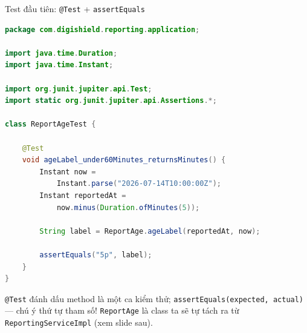 \documentclass[aspectratio=169,12pt]{beamer}
\begin{document}
\begin{frame}[fragile,shrink=8]{Test đầu tiên: \texttt{@Test} + \texttt{assertEquals}}
\begin{lstlisting}[language=java]
package com.digishield.reporting.application;

import java.time.Duration;
import java.time.Instant;

import org.junit.jupiter.api.Test;
import static org.junit.jupiter.api.Assertions.*;

class ReportAgeTest {

    @Test
    void ageLabel_under60Minutes_returnsMinutes() {
        Instant now =
            Instant.parse("2026-07-14T10:00:00Z");
        Instant reportedAt =
            now.minus(Duration.ofMinutes(5));

        String label = ReportAge.ageLabel(reportedAt, now);

        assertEquals("5p", label);
    }
}
\end{lstlisting}
  \vspace{-0.3em}
  {\small \texttt{@Test} đánh dấu method là một ca kiểm thử;
  \texttt{assertEquals(expected, actual)} --- chú ý thứ tự tham số!
  \texttt{ReportAge} là class ta sẽ tự tách ra từ
  \texttt{ReportingServiceImpl} (xem slide sau).}
\end{frame}
\end{document}

